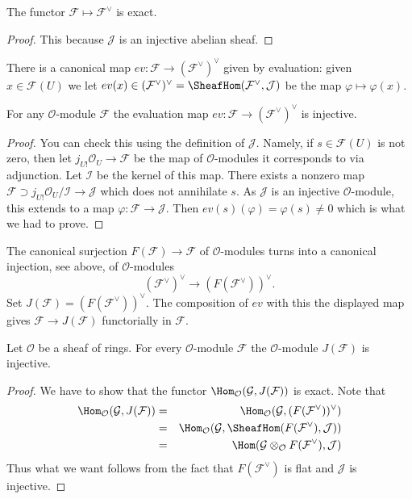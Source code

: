 \begin{lemma}
\label{lemma-vee-exact-sheaves}
The functor $\mathcal{F} \mapsto \mathcal{F}^\vee$ is exact.
\end{lemma}

\begin{proof}
This because $\mathcal{J}$ is an injective abelian sheaf.
\end{proof}

\noindent
There is a canonical map $ev : \mathcal{F} \to (\mathcal{F}^\vee)^\vee$
given by evaluation: given $x \in \mathcal{F}(U)$ we let
$ev(x) \in (\mathcal{F}^\vee)^\vee =
\SheafHom(\mathcal{F}^\vee, \mathcal{J})$
be the map $\varphi \mapsto \varphi(x)$.

\begin{lemma}
\label{lemma-ev-injective-sheaves}
For any $\mathcal{O}$-module $\mathcal{F}$ the evaluation map
$ev : \mathcal{F} \to (\mathcal{F}^\vee)^\vee$ is injective.
\end{lemma}

\begin{proof}
You can check this using the definition of $\mathcal{J}$.
Namely, if $s \in \mathcal{F}(U)$ is not zero, then let
$j_{U!}\mathcal{O}_U \to \mathcal{F}$ be the map of
$\mathcal{O}$-modules it corresponds to via adjunction.
Let $\mathcal{I}$ be the kernel of this map. There exists
a nonzero map $\mathcal{F} \supset j_{U!}\mathcal{O}_U/\mathcal{I}
\to \mathcal{J}$ which does not annihilate $s$. As $\mathcal{J}$ is
an injective $\mathcal{O}$-module, this extends to a map
$\varphi : \mathcal{F} \to \mathcal{J}$.
Then $ev(s)(\varphi) = \varphi(s) \not = 0$ which is what we had to prove.
\end{proof}

\noindent
The canonical surjection
$F(\mathcal{F}) \to \mathcal{F}$ of $\mathcal{O}$-modules turns into a
canonical injection, see above, of $\mathcal{O}$-modules
$$
(\mathcal{F}^\vee)^\vee \longrightarrow (F(\mathcal{F}^\vee))^\vee.
$$
Set $J(\mathcal{F}) = (F(\mathcal{F}^\vee))^\vee$.
The composition of $ev$ with this
the displayed map gives
$\mathcal{F} \to J(\mathcal{F})$ functorially in $\mathcal{F}$.

\begin{lemma}
\label{lemma-JM-injective-sheaves}
Let $\mathcal{O}$ be a sheaf of rings.
For every $\mathcal{O}$-module $\mathcal{F}$ the
$\mathcal{O}$-module $J(\mathcal{F})$ is injective.
\end{lemma}

\begin{proof}
We have to show that the functor
$\Hom_\mathcal{O}(\mathcal{G}, J(\mathcal{F}))$
is exact. Note that
\begin{eqnarray*}
\Hom_\mathcal{O}(\mathcal{G}, J(\mathcal{F}))
& = &
\Hom_\mathcal{O}(\mathcal{G}, (F(\mathcal{F}^\vee))^\vee) \\
& = &
\Hom_\mathcal{O}
(\mathcal{G}, \SheafHom(F(\mathcal{F}^\vee), \mathcal{J})) \\
& = &
\Hom(\mathcal{G} \otimes_\mathcal{O} F(\mathcal{F}^\vee), \mathcal{J})
\end{eqnarray*}
Thus what we want follows from the fact that $F(\mathcal{F}^\vee)$
is flat and $\mathcal{J}$ is injective.
\end{proof}

